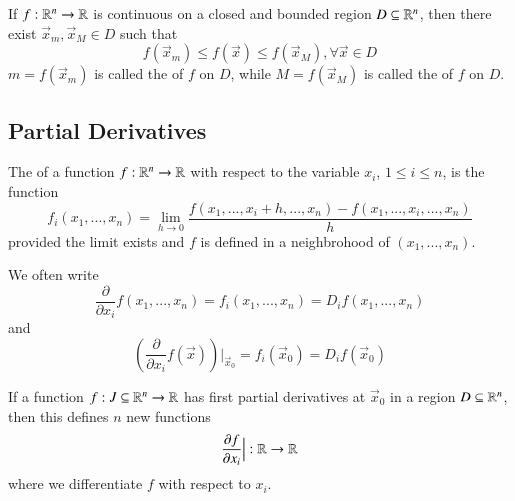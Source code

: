 \documentclass[12pt, a4paper, oneside, openright, titlepage]{book}
\begin{document}
\begin{appendices}
    \begin{namthm}
        If $f:\mathbb R^n \rightarrow \mathbb R$ is continuous on a closed and bounded region $D \subseteq \mathbb R^n$, then there exist $\vec{x}_m,\vec{x}_M \in D$ such that \begin{equation}
            f(\vec{x}_m) \leq f(\vec{x}) \leq f(\vec{x}_M), \forall \vec{x} \in D
        \end{equation}
        $m = f(\vec{x}_m)$ is called the  of $f$ on $D$, while $M = f(\vec{x}_M)$ is called the  of $f$ on $D$.
    \end{namthm}
    

    \subsection{Partial Derivatives}

    \begin{defn}
        The  of a function $f:\mathbb R^n\rightarrow \mathbb R$ with respect to the variable $x_i$, $1 \leq i \leq n$, is the function \begin{equation}
            f_i(x_1,...,x_n) = \lim_{h\rightarrow 0}\frac{f(x_1,...,x_i+h,...,x_n) - f(x_1,...,x_i,...,x_n)}{h}
        \end{equation}
        provided the limit exists and $f$ is defined in a neighbrohood of $(x_1,...,x_n)$.
    \end{defn}

    \begin{nota}
        We often write \begin{equation}
            \frac{\partial}{\partial x_i}f(x_1,...,x_n) = f_i(x_1,...,x_n) = D_if(x_1,...,x_n)
        \end{equation}
        and \begin{equation}
            \left(\frac{\partial}{\partial x_i}f(\vec{x})\right)\Big\rvert_{\vec{x}_0} = f_i(\vec{x}_0) = D_if(\vec{x}_0)
        \end{equation}
    \end{nota}
    

    \begin{rmk}
        If a function $f:J\subseteq \mathbb R^n\rightarrow \mathbb R$ has first partial derivatives at $\vec{x}_0$ in a region $D \subseteq \mathbb R^n$, then this defines $n$ new functions \begin{equation}
            \frac{\partial f}{\partial x_i}\Big\rvert:\mathbb R\rightarrow \mathbb R
        \end{equation}
        where we differentiate $f$ with respect to $x_i$.
    \end{rmk}


\end{appendices}
\end{document}

